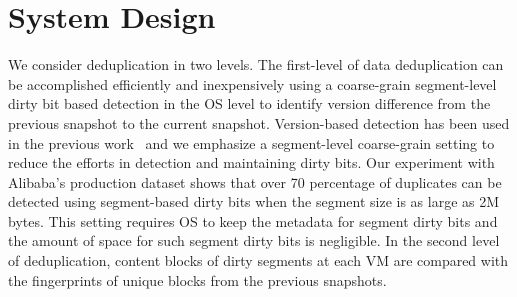 \section{System Design}
\label{sect:arch}




We consider deduplication in two levels. The first-level of data deduplication can be accomplished efficiently and 
inexpensively using a coarse-grain segment-level  dirty bit based detection in the OS level  to 
identify version difference from the previous snapshot to the current snapshot.  
Version-based detection has been used in the previous work~\cite{Clements2009,Vrable2009,TanIPDPS2011} and
we emphasize a segment-level coarse-grain setting to reduce the efforts in detection and maintaining dirty bits. 
Our experiment with Alibaba's production dataset shows that over 70 percentage of 
duplicates can be detected using segment-based dirty bits when the segment size is as large as 2M bytes.  
This setting requires OS to keep the metadata for segment dirty bits and the amount of space for such segment 
dirty bits is negligible. In the second level of deduplication, content blocks of dirty segments at each VM 
are compared with the fingerprints of unique  blocks from the previous snapshots.

